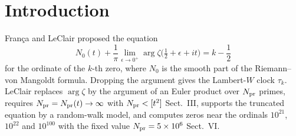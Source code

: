\documentclass[11pt,reqno]{amsart}
\makeatletter
\let\CG@origcite\cite
\renewcommand*{\cite}[2][]{\def\CG@citekey{#2}%
  \ifx\relax#1\relax\CG@origcite{#2}\else\CG@origcite[#1]{#2}\fi}
\numberwithin{equation}{section}
\theoremstyle{plain}
\theoremstyle{definition}
\theoremstyle{remark}
\newcommand{\NO}{N_0}
\makeatother
\begin{document}
\tableofcontents

\section{Introduction}
\label{sec:introduction}

Fran\c{c}a and LeClair \cite{FrancaLeClair2014,FrancaLeClair2015} proposed the equation
\begin{equation}
\NO(t)+\frac1\pi\lim_{\epsilon\to0^+}\arg\zeta\bigl(\tfrac12+\epsilon+it\bigr)=k-\frac12
\label{eq:intro_FL}
\end{equation}
for the ordinate of the $k$-th zero, where $\NO$ is the smooth part of the Riemann--von Mangoldt formula. Dropping the argument gives the Lambert-$W$ clock $\tau_k$. LeClair \cite{LeClair2021} replaces $\arg\zeta$ by the argument of an Euler product over $N_{\rm pr}$ primes, requires $N_{\rm pr}=N_{\rm pr}(t)\to\infty$ with $N_{\rm pr}<[t^2]$ \cite[Sect.~III]{LeClair2021}, supports the truncated equation by a random-walk model, and computes zeros near the ordinals $10^{21}$, $10^{22}$ and $10^{100}$ with the fixed value $N_{\rm pr}=5\times10^6$ \cite[Sect.~VI]{LeClair2021}.
\end{document}
